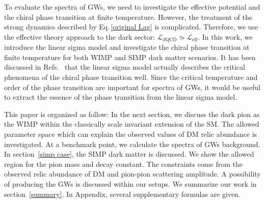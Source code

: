 \documentclass[a4paper,preprint,superscriptaddress,preprintnumbers,nofootinbib]{revtex4}
\newcommand{\Lag}{\mathcal L}
\begin{document}
To evaluate the spectra of GWs, we need to investigate the effective potential and the chiral phase transition at finite temperature. 
However, the treatment of the strong dynamics described by Eq.\,\eqref{original Lag} is complicated. 
Therefore, we use the effective theory approach to the dark sector: $\Lag_\text{dQCD}\simeq \Lag_\text{eff}$.
In this work, we introduce the linear sigma model and investigate the chiral phase transition at finite temperature for both WIMP and SIMP dark matter scenarios.
It has been discussed in Refs.~\cite{Lenaghan:2000ey,Roder:2003uz} that the linear sigma model actually describes the critical phenomena of the chiral phase transition well.
Since the critical temperature and order of the phase transition are important for spectra of GWs, it would be useful to extract the essence of the phase transition from the linear sigma model.


This paper is organized as follow:
In the next section, we discuss the dark pion as the WIMP within the classically scale invariant extension of the SM.
The allowed parameter space which can explain the observed values of DM relic abundance is investigated.
At a benchmark point, we calculate the spectra of GWs background.
In section~\ref{simp case}, the SIMP dark matter is discussed.
We show the allowed region for the pion mass and decay constant. 
The constraints come from the observed relic abundance of DM and pion-pion scattering amplitude.
A possibility of producing the GWs is discussed within our setups. 
We summarize our work in section~\ref{summary}.
In Appendix, several supplementary formulas are given.
\end{document}
